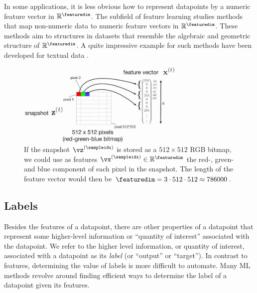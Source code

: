 \documentclass[12pt]{report}
\newcommand{\featurelen}{\featuredim}
\begin{document}
In some applications, it is less obvious how to represent datapoints 
by a numeric feature vector in $\mathbb{R}^{\featurelen}$. The subfield 
of feature learning studies methods that map non-numeric data to numeric 
feature vectors in $\mathbb{R}^{\featuredim}$. These methods aim to 
structures in datasets that resemble the algebraic and geometric structure 
of $\mathbb{R}^{\featurelen}$. A quite impressive example for such methods 
have been developed for textual data \cite{Mikolov2013}. 



\begin{figure}[htbp]
	\begin{center}
		\includegraphics[width=8cm]{RumbaSnapshotFeature1.jpg}  
	\end{center}
	\caption{If the snapshot $\vz^{(\sampleidx)}$ is stored as a $512 \times 512$ RGB bitmap, we could use as 
		features $\vx^{(\sampleidx)} \in \mathbb{R}^{\featuredim}$ the red-, green- and blue component of each pixel 
		in the snapshot. The length of the feature vector would then be $\featuredim= 3 \cdot 512 \cdot 512 \approx 786000$. }
	\label{fig_snapshot_pixels}
\end{figure}

\subsection{Labels}
\label{sec_labels}

Besides the features of a datapoint, there are other properties of a datapoint that represent 
some higher-level information or ``quantity of interest'' 
associated with the datapoint. We refer to the higher level information, or quantity of 
interest, associated with a datapoint as its \emph{label} (or ``output'' or ``target''). 
In contrast to features, determining the value of labels is more difficult to automate. 
Many ML methods revolve around finding efficient ways to determine the label of a 
datapoint given its features. 
\end{document}
